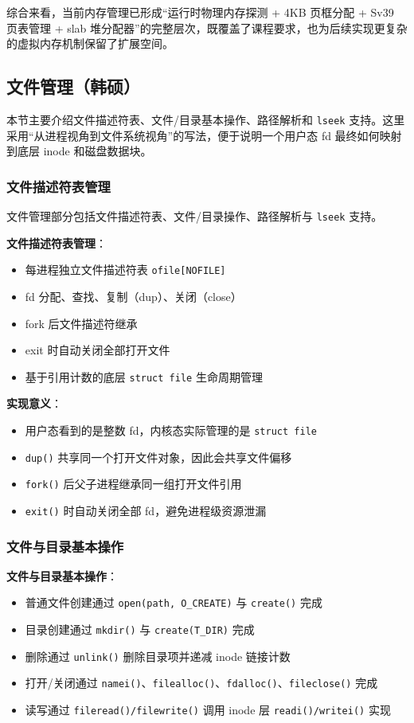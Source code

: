 \documentclass[12pt,a4paper]{ctexart}
\begin{document}
综合来看，当前内存管理已形成“运行时物理内存探测 + 4KB 页框分配 + Sv39 页表管理 + slab 堆分配器”的完整层次，既覆盖了课程要求，也为后续实现更复杂的虚拟内存机制保留了扩展空间。

\subsection{文件管理（韩硕）}

本节主要介绍文件描述符表、文件/目录基本操作、路径解析和 \texttt{lseek} 支持。这里采用“从进程视角到文件系统视角”的写法，便于说明一个用户态 fd 最终如何映射到底层 inode 和磁盘数据块。

\subsubsection{文件描述符表管理}

文件管理部分包括文件描述符表、文件/目录操作、路径解析与 \texttt{lseek} 支持。

\textbf{文件描述符表管理}：
\begin{itemize}
  \item 每进程独立文件描述符表 \texttt{ofile[NOFILE]}
  \item fd 分配、查找、复制（dup）、关闭（close）
  \item fork 后文件描述符继承
  \item exit 时自动关闭全部打开文件
  \item 基于引用计数的底层 \texttt{struct file} 生命周期管理
\end{itemize}

\textbf{实现意义}：
\begin{itemize}
  \item 用户态看到的是整数 fd，内核态实际管理的是 \texttt{struct file}
  \item \texttt{dup()} 共享同一个打开文件对象，因此会共享文件偏移
  \item \texttt{fork()} 后父子进程继承同一组打开文件引用
  \item \texttt{exit()} 时自动关闭全部 fd，避免进程级资源泄漏
\end{itemize}

\subsubsection{文件与目录基本操作}

\textbf{文件与目录基本操作}：
\begin{itemize}
  \item 普通文件创建通过 \texttt{open(path, O\_CREATE)} 与 \texttt{create()} 完成
  \item 目录创建通过 \texttt{mkdir()} 与 \texttt{create(T\_DIR)} 完成
  \item 删除通过 \texttt{unlink()} 删除目录项并递减 inode 链接计数
  \item 打开/关闭通过 \texttt{namei()}、\texttt{filealloc()}、\texttt{fdalloc()}、\texttt{fileclose()} 完成
  \item 读写通过 \texttt{fileread()/filewrite()} 调用 inode 层 \texttt{readi()/writei()} 实现
\end{itemize}
\end{document}
